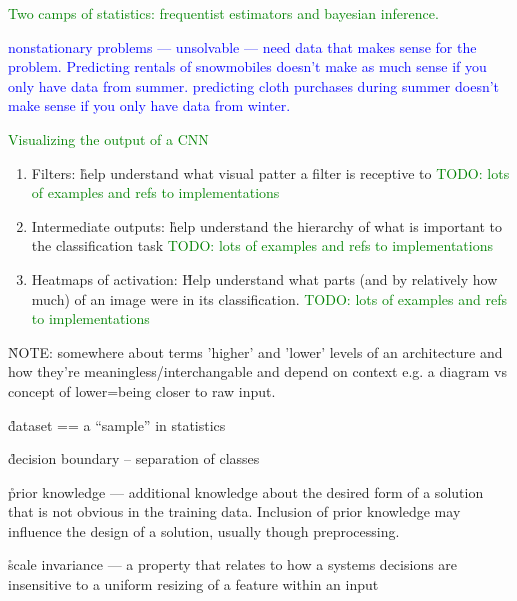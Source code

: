 \textcolor{green}{Two camps of statistics: frequentist estimators and bayesian inference.}




\textcolor{blue}{nonstationary problems --- unsolvable --- need data that makes sense for the problem. Predicting rentals of snowmobiles doesn't make as much sense if you only have data from summer. predicting cloth purchases during summer doesn't make sense if you only have data from winter.}


\textcolor{green}{Visualizing the output of a CNN}

\begin{enumerate}
	\item Filters: \r{help understand what visual patter a filter is receptive to \textcolor{green}{TODO: lots of examples and refs to implementations}}
	\item Intermediate outputs: \r{help understand the hierarchy of what is important to the classification task \textcolor{green}{TODO: lots of examples and refs to implementations}}
	\item Heatmaps of activation: \r{Help understand what parts (and by relatively how much) of an image were in its classification. \textcolor{green}{TODO: lots of examples and refs to implementations}}
\end{enumerate}


\r{NOTE: somewhere about terms 'higher' and 'lower' levels of an architecture and how they're meaningless/interchangable and depend on context e.g. a diagram vs concept of lower=being closer to raw input.}

\r{dataset == a ``sample'' in statistics}

\r{decision boundary -- separation of classes}


\r{prior knowledge --- additional knowledge about the desired form of a solution that is not obvious in the training data.  Inclusion of prior knowledge may influence the design of a solution, usually though preprocessing.}


\r{scale invariance --- a property that relates to how a systems decisions are insensitive to a uniform resizing of a feature within an input }

